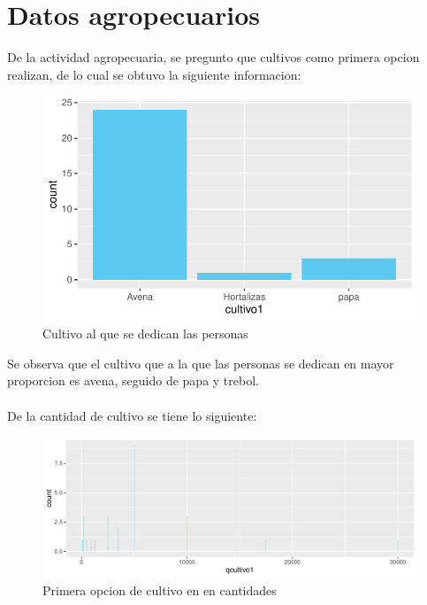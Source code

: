\documentclass[12pt]{article}\usepackage[]{graphicx}\usepackage[]{xcolor}
\makeatletter
\def\maxwidth{ %
  \ifdim\Gin@nat@width>\linewidth
    \linewidth
  \else
    \Gin@nat@width
  \fi
}
\newenvironment{kframe}{%
 \def\at@end@of@kframe{}%
 \ifinner\ifhmode%
  \def\at@end@of@kframe{\end{minipage}}%
  \begin{minipage}{\columnwidth}%
 \fi\fi%
 \def\FrameCommand##1{\hskip\@totalleftmargin \hskip-\fboxsep
 \colorbox{shadecolor}{##1}\hskip-\fboxsep
     \hskip-\linewidth \hskip-\@totalleftmargin \hskip\columnwidth}%
 \MakeFramed {\advance\hsize-\width
   \@totalleftmargin\z@ \linewidth\hsize
   \@setminipage}}%
 {\par\unskip\endMakeFramed%
 \at@end@of@kframe}
\newenvironment{knitrout}{}{} %
\makeatother
\begin{document}
	\section{Datos agropecuarios}
	De la actividad agropecuaria, se pregunto que cultivos como primera opcion realizan, de lo cual se obtuvo la siguiente informacion:
	\begin{figure}[H]
	\centering
\begin{knitrout}
\color{fgcolor}
\includegraphics[width=\maxwidth]{figure/seven-1} 
\end{knitrout}
	\caption{Cultivo al que se dedican las personas}
	\end{figure}
	Se observa que el cultivo que a la que las personas se dedican en mayor proporcion es avena, seguido de papa y trebol.\\
	\\
	De la cantidad de cultivo se tiene lo siguiente:
	\begin{figure}[H]
	\centering
\begin{knitrout}
\color{fgcolor}\begin{kframe}


{\ttfamily\noindent\color{warningcolor}{\#\# Warning: NAs introducidos por coerción}}\end{kframe}
\includegraphics[width=\maxwidth]{figure/eight-1} 
\end{knitrout}
	\caption{Primera opcion de cultivo en \comunidad \- en cantidades}
	\end{figure}
	
\end{document}
